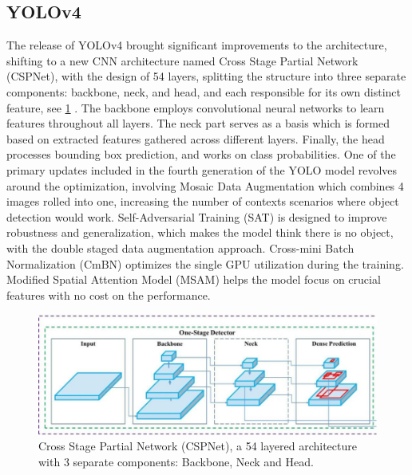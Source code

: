 \begin{multicols}{2}
\subsection{YOLOv4}
The release of YOLOv4 brought significant improvements to the architecture, shifting to a new CNN architecture named Cross Stage Partial Network (CSPNet), with the design of 54 layers, splitting the structure into three separate components: backbone, neck, and head, and each responsible for its own distinct feature, see \ref{fig:CSPNet} \citep{bochkovskiy2020yolov4, VisoAI2024}. The backbone employs convolutional neural networks to learn features throughout all layers. The neck part serves as a basis which is formed based on extracted features gathered across different layers. Finally, the head processes bounding box prediction, and works on class probabilities. One of the primary updates included in the fourth generation of the YOLO model revolves around the optimization, involving Mosaic Data Augmentation which combines 4 images rolled into one, increasing the number of contexts scenarios where object detection would work. Self-Adversarial Training (SAT) is designed to improve robustness and generalization, which makes the model think there is no object, with the double staged data augmentation approach. Cross-mini Batch Normalization (CmBN) optimizes the single GPU utilization during the training. Modified Spatial Attention Model (MSAM) helps the model focus on crucial features with no cost on the performance. 
\end{multicols}

\begin{figure}[ht]
    \centering
    \includegraphics[width=1\linewidth]{datas/Cross Stage Partial Network (CSPNet).png}
    \caption{Cross Stage Partial Network (CSPNet), a 54 layered architecture with 3 separate components: Backbone, Neck and Head.}
    \label{fig:CSPNet}
\end{figure}
 
